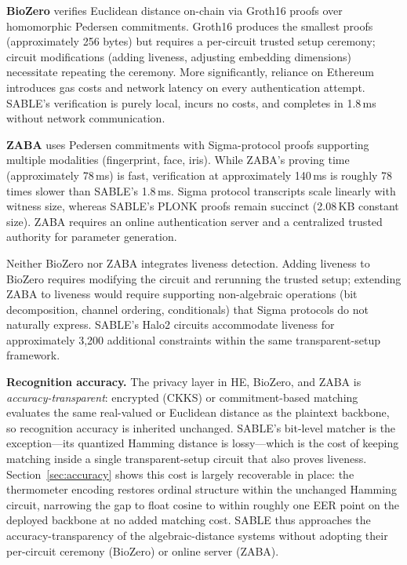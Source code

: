 \documentclass[conference]{IEEEtran}
\begin{document}
\textbf{BioZero} verifies Euclidean distance on-chain via Groth16 proofs over homomorphic Pedersen commitments. Groth16 produces the smallest proofs (approximately 256 bytes) but requires a per-circuit trusted setup ceremony; circuit modifications (adding liveness, adjusting embedding dimensions) necessitate repeating the ceremony. More significantly, reliance on Ethereum introduces gas costs and network latency on every authentication attempt. SABLE's verification is purely local, incurs no costs, and completes in 1.8\,ms without network communication.

\textbf{ZABA} uses Pedersen commitments with Sigma-protocol proofs supporting multiple modalities (fingerprint, face, iris). While ZABA's proving time (approximately 78\,ms) is fast, verification at approximately 140\,ms is roughly 78 times slower than SABLE's 1.8\,ms. Sigma protocol transcripts scale linearly with witness size, whereas SABLE's PLONK proofs remain succinct (2.08\,KB constant size). ZABA requires an online authentication server and a centralized trusted authority for parameter generation.

Neither BioZero nor ZABA integrates liveness detection. Adding liveness to BioZero requires modifying the circuit and rerunning the trusted setup; extending ZABA to liveness would require supporting non-algebraic operations (bit decomposition, channel ordering, conditionals) that Sigma protocols do not naturally express. SABLE's Halo2 circuits accommodate liveness for approximately 3,200 additional constraints within the same transparent-setup framework.

\textbf{Recognition accuracy.} The privacy layer in HE, BioZero, and ZABA is
\emph{accuracy-transparent}: encrypted (CKKS) or commitment-based matching
evaluates the same real-valued or Euclidean distance as the plaintext backbone,
so recognition accuracy is inherited unchanged. SABLE's bit-level matcher is the
exception---its quantized Hamming distance is lossy---which is the cost of
keeping matching inside a single transparent-setup circuit that also proves
liveness. Section~\ref{sec:accuracy} shows this cost is largely recoverable in
place: the thermometer encoding restores ordinal structure within the unchanged
Hamming circuit, narrowing the gap to float cosine to within roughly one EER
point on the deployed backbone at no added matching cost. SABLE thus approaches
the accuracy-transparency of the algebraic-distance systems without adopting
their per-circuit ceremony (BioZero) or online server (ZABA).
\end{document}
